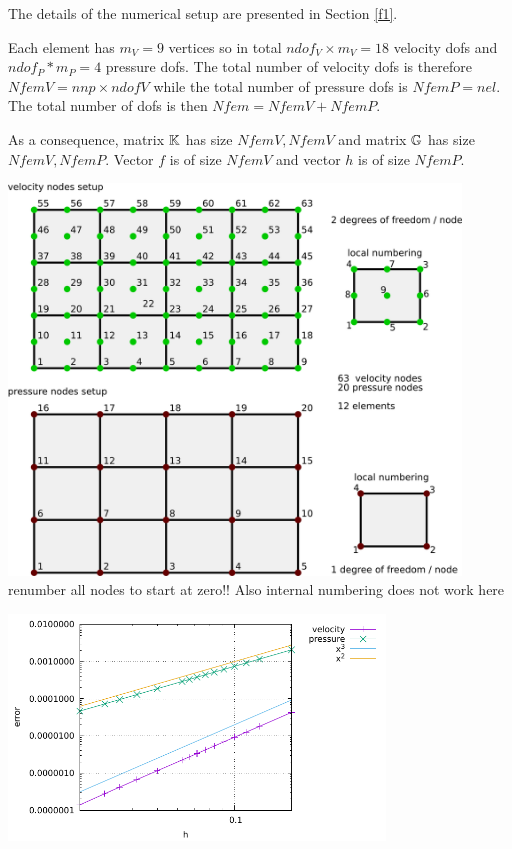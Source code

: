 

The details of the numerical setup are presented in Section \ref{f1}.

Each element has $m_V=9$ vertices so in total $ndof_V\times m_V=18$ velocity dofs and 
$ndof_P*m_P=4$ pressure dofs. The total number of 
velocity dofs is therefore $NfemV=nnp \times ndofV$ while the total number of
pressure dofs is $NfemP=nel$. The total number of dofs is then $Nfem=NfemV+NfemP$.

As a consequence, matrix ${\mathbb{K}}$ has size $NfemV,NfemV$ and matrix ${\mathbb{G}}$ has size $NfemV,NfemP$.
Vector $f$ is of size $NfemV$ and vector $h$ is of size $NfemP$.  

\begin{center}
\includegraphics[width=12cm]{python_codes/fieldstone_18/q2q1setup}\\
{\color{red} renumber all nodes to start at zero!! Also internal numbering does not work here }
\end{center}


\begin{center}
\includegraphics[width=10cm]{python_codes/fieldstone_18/errors}
\end{center}
